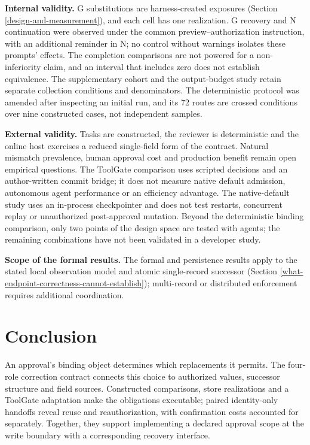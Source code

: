 \textbf{Internal validity.} G substitutions are harness-created exposures (Section \ref{design-and-measurement}), and each cell has one realization. G recovery and N continuation were observed under the common preview--authorization instruction, with an additional reminder in N; no control without warnings isolates these prompts' effects. The completion comparisons are not powered for a non-inferiority claim, and an interval that includes zero does not establish equivalence. The supplementary cohort and the output-budget study retain separate collection conditions and denominators. The deterministic protocol was amended after inspecting an initial run, and its 72 routes are crossed conditions over nine constructed cases, not independent samples.

\textbf{External validity.} Tasks are constructed, the reviewer is deterministic and the online host exercises a reduced single-field form of the contract. Natural mismatch prevalence, human approval cost and production benefit remain open empirical questions. The ToolGate comparison uses scripted decisions and an author-written commit bridge; it does not measure native default admission, autonomous agent performance or an efficiency advantage. The native-default study uses an in-process checkpointer and does not test restarts, concurrent replay or unauthorized post-approval mutation. Beyond the deterministic binding comparison, only two points of the design space are tested with agents; the remaining combinations have not been validated in a developer study.

\textbf{Scope of the formal results.} The formal and persistence results apply to the stated local observation model and atomic single-record successor (Section \ref{what-endpoint-correctness-cannot-establish}); multi-record or distributed enforcement requires additional coordination.

\section{Conclusion}\label{conclusion}

An approval's binding object determines which replacements it permits. The four-role correction contract connects this choice to authorized values, successor structure and field sources. Constructed comparisons, store realizations and a ToolGate adaptation make the obligations executable; paired identity-only handoffs reveal reuse and reauthorization, with confirmation costs accounted for separately. Together, they support implementing a declared approval scope at the write boundary with a corresponding recovery interface.